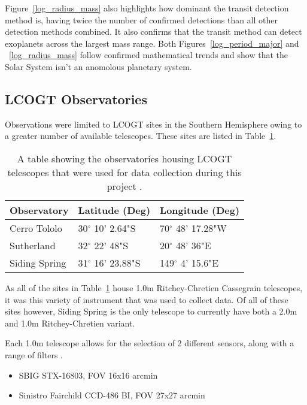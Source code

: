 \documentclass{report}
\begin{document}
 Figure~\ref{log_radius_mass} also highlights how dominant the transit detection method is, having twice the number of confirmed detections than all other detection methods combined. It also confirms that the transit method can detect exoplanets across the largest mass range. Both Figures~\ref{log_period_major} and ~\ref{log_radius_mass} follow confirmed mathematical trends and show that the Solar System isn't an anomolous planetary system.


\subsection{LCOGT Observatories}
Observations were limited to LCOGT sites in the Southern Hemisphere owing to a greater number of available telescopes. These sites are listed in Table~\ref{observatory}.

\begin{table}[H]
    \centering
    \begin{tabular}{ | l | l | l | }
    \hline \hline
    Observatory & Latitude (Deg) & Longitude (Deg)       \\ \hline \hline
    Cerro Tololo    & 30$^\circ$ 10' 2.64"S & 70$^\circ$ 48' 17.28"W  \\
    Sutherland   & 32$^\circ$ 22' 48"S & 20$^\circ$ 48' 36"E  \\
    Siding Spring  & 31$^\circ$ 16' 23.88"S & 149$^\circ$ 4' 15.6"E \\
    \hline
    \end{tabular}
    \caption{A table showing the observatories housing LCOGT telescopes that were used for data collection during this project \parencite{sites}.}
    \label{observatory}
\end{table}

As all of the sites in Table~\ref{observatory} house 1.0m Ritchey-Chretien Cassegrain telescopes, it was this variety of instrument that was used to collect data. Of all of these sites however, Siding Spring is the only telescope to currently have both a 2.0m and 1.0m Ritchey-Chretien variant. 

Each 1.0m telescope allows for the selection of 2 different sensors, along with a range of filters \parencite{1m}.

\begin{itemize}

  \item SBIG STX-16803, FOV 16x16 arcmin
  \item Sinistro Fairchild CCD-486 BI, FOV 27x27 arcmin

\end{itemize} 
\end{document}
